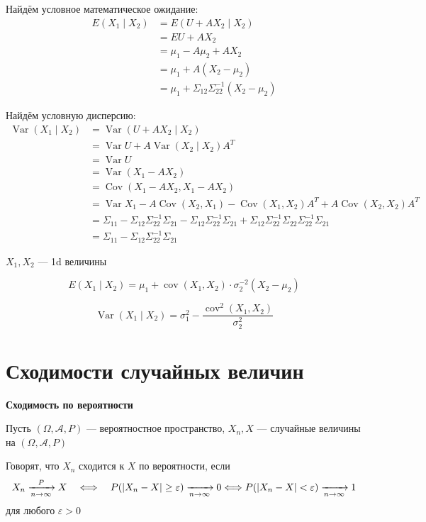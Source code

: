 \documentclass[12pt,a4paper]{article}
\begin{document}
\begin{example}
Найдём условное математическое ожидание:
\[
\begin{aligned}
E(X_1\mid X_2)
&=
E(U+AX_2\mid X_2)\\
&=
EU+AX_2\\
&=
\mu_1-A\mu_2+AX_2\\
&=
\mu_1+A(X_2-\mu_2)\\
&=
\mu_1+
\Sigma_{12}\Sigma_{22}^{-1}(X_2-\mu_2)
\end{aligned}
\]

Найдём условную дисперсию:
\[
\begin{aligned}
\operatorname{Var}(X_1\mid X_2)
&=
\operatorname{Var}(U+AX_2\mid X_2)\\
&=
\operatorname{Var}U
+
A\operatorname{Var}(X_2\mid X_2)A^T\\
&=
\operatorname{Var}U\\
&=
\operatorname{Var}(X_1-AX_2)\\
&=
\operatorname{Cov}(X_1-AX_2,X_1-AX_2)\\
&=
\operatorname{Var}X_1
-
A\operatorname{Cov}(X_2,X_1)
-
\operatorname{Cov}(X_1,X_2)A^T
+
A\operatorname{Cov}(X_2,X_2)A^T\\
&=
\Sigma_{11}
-
\Sigma_{12}\Sigma_{22}^{-1}\Sigma_{21}
-
\Sigma_{12}\Sigma_{22}^{-1}\Sigma_{21}
+
\Sigma_{12}\Sigma_{22}^{-1}
\Sigma_{22}
\Sigma_{22}^{-1}\Sigma_{21}\\
&=
\Sigma_{11}
-
\Sigma_{12}\Sigma_{22}^{-1}\Sigma_{21}
\end{aligned}
\]

\begin{corollary}

$X_1,X_2$ --- 1d величины

\[
E(X_1\mid X_2)
=
\mu_1
+
\operatorname{cov}(X_1,X_2)\cdot
\sigma_2^{-2}(X_2-\mu_2)
\]

\[
\operatorname{Var}(X_1\mid X_2)
=
\sigma_1^2
-
\frac{\operatorname{cov}^2(X_1,X_2)}
{\sigma_2^2}
\]

\end{corollary}

\end{example}

\newpage

\section{Сходимости случайных величин}

\begin{definition}

\textbf{Сходимость по вероятности}

Пусть $(\Omega,\mathcal{A},P)$ --- вероятностное пространство, $X_n,X$ --- случайные величины на $(\Omega,\mathcal{A},P)$

Говорят, что $X_n$ сходится к $X$ по вероятности, если
\[
X_n\xrightarrow[n\to\infty]{P}X
\quad\Longleftrightarrow\quad
P(|X_n-X|\geq\varepsilon)\xrightarrow[n\to\infty]{}0
\\
\Longleftrightarrow P(|X_n-X|<\varepsilon)\xrightarrow[n\to\infty]{}1
\]
для любого $\varepsilon>0$

\end{definition}
\end{document}
